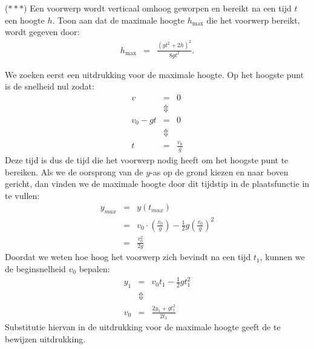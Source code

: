 \documentclass{ximera}
\begin{document}
\begin{exercise}
    ($\ast\ast\ast$) Een voorwerp wordt verticaal omhoog geworpen en bereikt na een tijd $t$ een hoogte $h$. Toon aan dat de maximale hoogte $h_{\text{max}}$ die het voorwerp bereikt, wordt gegeven door:
    \begin{eqnarray*}
        h_{\text{max}}&=&\frac{(gt^2+2h)^2}{8gt^2}.
    \end{eqnarray*}
    \begin{oplossing}
        We zoeken eerst een uitdrukking voor de maximale hoogte. Op het hoogste punt is de snelheid nul zodat:
        \begin{eqnarray*}
            v&=&0\\
            &\Updownarrow&\\
            v_0-gt&=&0\\
            &\Updownarrow&\\
            t&=&\frac{v_0}{g}
        \end{eqnarray*}
        Deze tijd is dus de tijd die het voorwerp nodig heeft om het hoogste punt te bereiken. Als we de oorsprong van de $y$-as op de grond kiezen en naar boven gericht, dan vinden we de maximale hoogte door dit tijdstip in de plaatsfunctie in te vullen:
        \begin{eqnarray*}
            y_{max}&=&y(t_{max})\\
            &=&v_0\cdot\left(\frac{v_0}{g}\right)-\frac{1}{2}g\left(\frac{v_0}{g}\right)^2\\
            &=&\frac{v_0^2}{2g}
        \end{eqnarray*}
        Doordat we weten hoe hoog het voorwerp zich bevindt na een tijd $t_1$, kunnen we de beginsnelheid $v_0$ bepalen:
        \begin{eqnarray*}
            y_1&=&v_0t_1-\frac{1}{2}gt_1^2\\
            &\Updownarrow&\\
            v_0&=&\frac{2y_1+gt_1^2}{2t_1}
        \end{eqnarray*}
        Substitutie hiervan in de uitdrukking voor de maximale hoogte geeft de te bewijzen uitdrukking.
    \end{oplossing}
\end{exercise}
\end{document}
